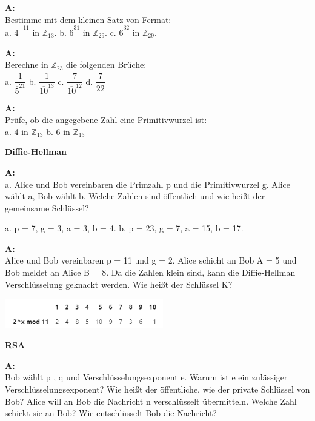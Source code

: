 \documentclass[landscape,twocolumn,a4paper]{article}
\begin{document}
\textbf{A:}   \\
Bestimme mit dem kleinen Satz von Fermat: \\
 a.  $\overline{4}^{-11}$ in  $\mathbb{Z}_{13}$. \quad
 b.  $\overline{6}^{31}$ in  $\mathbb{Z}_{29}$. \quad
 c.  $ \overline{6}^{32}$ in  $\mathbb{Z}_{29}$. 
\bigskip {}

\textbf{A:}   \\
Berechne in $\mathbb{Z}_{23}$ die folgenden Brüche: \\
a.  $\dfrac{\overline{1}}{\overline{5}^{21}} $ \quad
b.  $\dfrac{\overline{1}}{\overline{10}^{13}} $ \quad
c.  $\dfrac{\overline{7}}{\overline{10}^{12}} $ \quad
d.  $\dfrac{\overline{7}}{\overline{22}} $ 
\bigskip {}

\textbf{A:}   \\
Prüfe, ob die angegebene Zahl eine Primitivwurzel ist: \\
 a. 4 in  $\mathbb{Z}_{13}$ \quad  b. 6 in  $\mathbb{Z}_{13}$
\bigskip {}

\newpage

\textbf{Diffie-Hellman} \bigskip

\textbf{A:}   \\
a. Alice und Bob vereinbaren die Primzahl p und die Primitivwurzel g.
Alice wählt a, Bob wählt b. Welche Zahlen sind öffentlich und wie heißt der gemeinsame Schlüssel?

a.  p = 7, g = 3, a = 3, b = 4.  \quad
b.  p = 23, g = 7, a = 15, b = 17.

\bigskip {}

\textbf{A:}   \\
Alice und Bob vereinbaren p = 11 und g = 2. Alice schicht an Bob A = 5 und Bob meldet an Alice B = 8. Da die Zahlen klein sind, kann die Diffie-Hellman Verschlüsselung geknackt werden.  Wie heißt der Schlüssel K?

\includegraphics[width=6.9cm]{potenzen.png}
\bigskip {}

\textbf{RSA} \bigskip

\textbf{A:}   \\
Bob wählt p , q  und Verschlüsselungsexponent e. Warum ist e ein
zulässiger Verschlüsselungsexponent? Wie heißt der öffentliche, wie der private Schlüssel von Bob?
Alice will an Bob die Nachricht n verschlüsselt übermitteln.  
Welche Zahl schickt sie an Bob? Wie entschlüsselt Bob die Nachricht?
\end{document}
